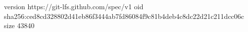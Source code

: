 version https://git-lfs.github.com/spec/v1
oid sha256:ced8cd328802d41eb86f3444ab7fd86084f9c81b4deb4c8dc22d21c211dcc06c
size 43840
